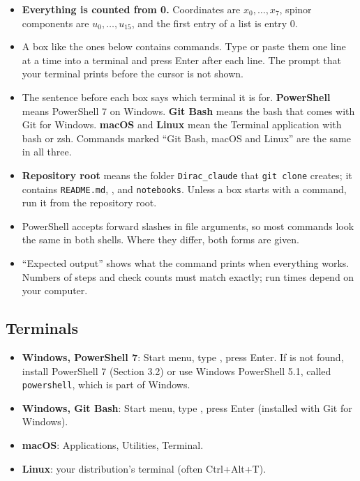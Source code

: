 \documentclass[11pt]{article}
\begin{document}
\begin{itemize}
\item \textbf{Everything is counted from 0.} Coordinates are $x_0,\dots,x_7$, spinor components are $u_0,\dots,u_{15}$, and the first entry of a list is entry 0.
\item A box like the ones below contains commands. Type or paste them one line at a time into a terminal and press Enter after each line. The prompt that your terminal prints before the cursor is not shown.
\item The sentence before each box says which terminal it is for. \textbf{PowerShell} means PowerShell 7 on Windows. \textbf{Git Bash} means the bash that comes with Git for Windows. \textbf{macOS} and \textbf{Linux} mean the Terminal application with bash or zsh. Commands marked ``Git Bash, macOS and Linux'' are the same in all three.
\item \textbf{Repository root} means the folder \texttt{Dirac\_cl\allowbreak{}aude} that \texttt{git clon\allowbreak{}e} creates; it contains \texttt{README.m\allowbreak{}d}, \texttt{}, \texttt{} and \texttt{notebook\allowbreak{}s}. Unless a box starts with a \texttt{} command, run it from the repository root.
\item PowerShell accepts forward slashes in file arguments, so most commands look the same in both shells. Where they differ, both forms are given.
\item ``Expected output'' shows what the command prints when everything works. Numbers of steps and check counts must match exactly; run times depend on your computer.
\end{itemize}

\subsection{Terminals}

\begin{itemize}
\item \textbf{Windows, PowerShell 7}: Start menu, type \texttt{}, press Enter. If \texttt{} is not found, install PowerShell 7 (Section 3.2) or use Windows PowerShell 5.1, called \texttt{powershe\allowbreak{}ll}, which is part of Windows.
\item \textbf{Windows, Git Bash}: Start menu, type \texttt{}, press Enter (installed with Git for Windows).
\item \textbf{macOS}: Applications, Utilities, Terminal.
\item \textbf{Linux}: your distribution's terminal (often Ctrl+Alt+T).
\end{itemize}
\end{document}
